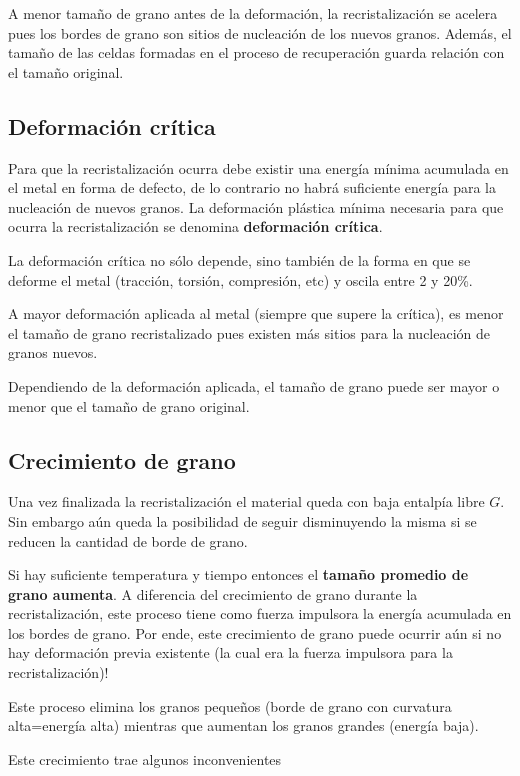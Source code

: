 A menor tamaño de grano antes de la deformación, la recristalización se acelera pues los bordes de grano son sitios de nucleación de los nuevos granos. Además, el tamaño de las celdas formadas en el proceso de recuperación guarda relación con el tamaño original.


\subsection{Deformación crítica}

Para que la recristalización ocurra debe existir una energía mínima acumulada en el metal en forma de defecto, de lo contrario no habrá suficiente energía para la nucleación de nuevos granos. La deformación plástica mínima necesaria para que ocurra la recristalización se denomina \textbf{deformación crítica}.

La deformación crítica no sólo depende, sino también de la forma en que se deforme el metal (tracción, torsión, compresión, etc) y oscila entre 2 y 20\%.

A mayor deformación aplicada al metal (siempre que supere la crítica), es menor el tamaño de grano recristalizado pues existen más sitios para la nucleación de granos nuevos. 

Dependiendo de la deformación aplicada, el tamaño de grano puede ser mayor o menor que el tamaño de grano original.

\subsection{Crecimiento de grano}

Una vez finalizada la recristalización el material queda con baja entalpía libre $G$. Sin embargo aún queda la posibilidad de seguir disminuyendo la misma si se reducen la cantidad de borde de grano.

Si hay suficiente temperatura y tiempo entonces el \textbf{tamaño promedio de grano aumenta}. A diferencia del crecimiento de grano durante la recristalización, este proceso tiene como fuerza impulsora la energía acumulada en los bordes de grano. Por ende, este crecimiento de grano puede ocurrir aún si no hay deformación previa existente (la cual era la fuerza impulsora para la recristalización)!

Este proceso elimina los granos pequeños (borde de grano con curvatura alta=energía alta) mientras que aumentan los granos grandes (energía baja).

Este crecimiento trae algunos inconvenientes

